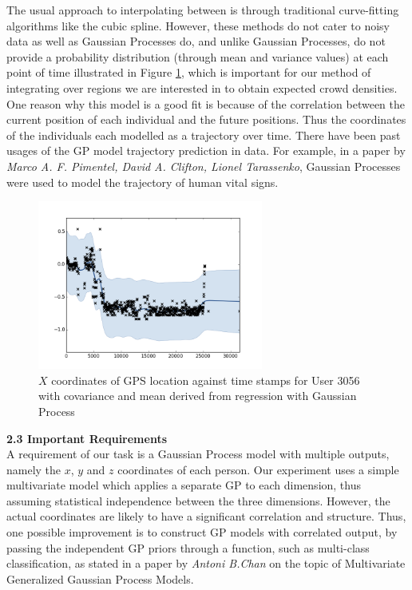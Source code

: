 \documentclass[letterpaper]{article}
\begin{document}
The usual approach to interpolating between is through traditional curve-fitting algorithms like the cubic spline. However, these methods do not cater to noisy data as well as Gaussian Processes do, and unlike Gaussian Processes, do not provide a probability distribution (through mean and variance values) at each point of time illustrated in Figure \ref{fig:GP1}, which is important for our method of integrating over regions we are interested in to obtain expected crowd densities.\\

One reason why this model is a good fit is because of the correlation between the current position of each individual and the future positions. Thus the coordinates of the individuals each modelled as a trajectory over time. There have been past usages of the GP model trajectory prediction in data. For example, in a paper by {\it Marco A. F. Pimentel, David A. Clifton, Lionel Tarassenko}, Gaussian Processes were used to model the trajectory of human vital signs. \\

\begin{figure}[h!]
  \centering
    \includegraphics[width=280px,natwidth=634,natheight=442]{selected_GP/3056.csv_X.png}
  \caption{$X$ coordinates of GPS location against time stamps for User 3056 with covariance and mean derived from regression with Gaussian Process}
  \label{fig:GP1}
\end{figure}

{\bf2.3  Important Requirements} \\

A requirement of our task is a Gaussian Process model with multiple outputs, namely the $x$, $y$ and $z$ coordinates of each person. Our experiment uses a simple multivariate model which applies a separate GP to each dimension, thus assuming statistical independence between the three dimensions. However, the actual coordinates are likely to have a significant correlation and structure. Thus, one possible improvement is to construct GP models with correlated output, by passing the independent GP priors through a function, such as multi-class classification, as stated in a paper by {\it Antoni B.Chan} on the topic of Multivariate Generalized Gaussian Process Models. \\
\end{document}
